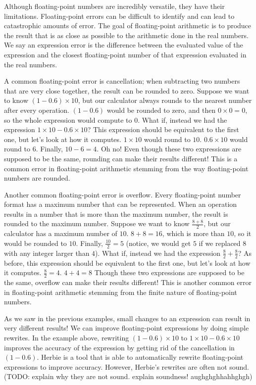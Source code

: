 \documentclass[11pt]{article}
\begin{document}
Although floating-point numbers are incredibly versatile, they have their
  limitations.
Floating-point errors can be difficult to identify and can lead to catastrophic
  amounts of error.
The goal of floating-point arithmetic is to produce the result that is as close
  as possible to the arithmetic done in the real numbers.
We say an expression error is the difference between the evaluated value of the
  expression and the closest floating-point number of that expression evaluated
  in the real numbers.


A common floating-point error is cancellation; when subtracting two numbers that are very
  close together, the result can be rounded to zero.
Suppose we want to know $(1 - 0.6) \times 10$, but our calculator always rounds to 
  the nearest number after every operation.
$(1 - 0.6)$ would be rounded to zero, and then $0 \times 0 = 0$, so the whole
  expression would compute to $0$.
What if, instead we had the expression $1 \times 10 - 0.6 \times 10$?
This expression should be equivalent to the first one, but let's look at how it computes.
$1 \times 10$ would round to $10$.
$0.6 \times 10$ would round to $6$.
Finally, $10 - 6 = 4$.
Oh no!
Even though these two expressions are supposed to be the same, rounding can make their
  results different!
This is a common error in floating-point arithmetic stemming from the way
  floating-point numbers are rounded.

Another common floating-point error is overflow.
Every floating-point number format has a maximum number that can be represented.
When an operation results in a number that is more than the maximum number, the result
  is rounded to the maximum number.
Suppose we want to know $\frac{8 + 8}{2}$, but our calculator has a maximum number of $10$.
$8 + 8 = 16$, which is more than $10$, so it would be rounded to $10$.
Finally, $\frac{10}{2} = 5$ (notice, we would get $5$ if we replaced $8$ with any integer larger than $4$).
What if, instead we had the expression $\frac{8}{2} + \frac{8}{2}$?
As before, this expression should be equivalent to the first one, but let's look at how it computes.
$\frac{8}{2} = 4$.
$4 + 4 = 8$ 
Though these two expressions are supposed to be the same, overflow can make their
  results different!
This is another common error in floating-point arithmetic stemming from the finite nature of
  floating-point numbers.

As we saw in the previous examples, small changes to an expression can result
  in very different results!
We can improve floating-point expressions by doing simple rewrites.
In the example above, rewriting $(1 - 0.6) \times 10$ to $1 \times 10 - 0.6 \times 10$ improves the accuracy of
  the expression by getting rid of the cancellation in $(1 - 0.6)$.
Herbie is a tool that is able to automatically rewrite floating-point
  expressions to improve accuracy.
However, Herbie’s rewrites are often not sound.
(TODO: explain why they are not sound.
explain soundness! aughghghhahhghgh)
\end{document}
